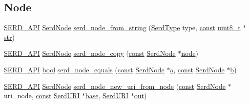\subsection*{Node}
\begin{DoxyCompactItemize}
\item 
\hyperlink{serd_8h_a17b2ce3a34831e5e95018430d798bd66}{S\+E\+R\+D\+\_\+\+A\+PI} \hyperlink{struct_serd_node}{Serd\+Node} \hyperlink{group__serd_gae76caf1b4e7a6465c9cb73ec11f568ea}{serd\+\_\+node\+\_\+from\+\_\+string} (\hyperlink{group__serd_ga7ccd8d4fb2c3a6ad690ed6d6fe1b45fa}{Serd\+Type} type, \hyperlink{getopt1_8c_a2c212835823e3c54a8ab6d95c652660e}{const} \hyperlink{lib-src_2ffmpeg_2win32_2stdint_8h_a9a941819355e6f658991890ff66b4b0e}{uint8\+\_\+t} $\ast$\hyperlink{sndfile__save_8m_a4b99ff73a8a869319570237b5c57ab03}{str})
\item 
\hyperlink{serd_8h_a17b2ce3a34831e5e95018430d798bd66}{S\+E\+R\+D\+\_\+\+A\+PI} \hyperlink{struct_serd_node}{Serd\+Node} \hyperlink{group__serd_ga5a25ffa37534176468ffc8e4e6ce8d7c}{serd\+\_\+node\+\_\+copy} (\hyperlink{getopt1_8c_a2c212835823e3c54a8ab6d95c652660e}{const} \hyperlink{struct_serd_node}{Serd\+Node} $\ast$\hyperlink{structnode}{node})
\item 
\hyperlink{serd_8h_a17b2ce3a34831e5e95018430d798bd66}{S\+E\+R\+D\+\_\+\+A\+PI} \hyperlink{mac_2config_2i386_2lib-src_2libsoxr_2soxr-config_8h_abb452686968e48b67397da5f97445f5b}{bool} \hyperlink{group__serd_ga19e58c93a79966be1e74d9d92f5ea167}{serd\+\_\+node\+\_\+equals} (\hyperlink{getopt1_8c_a2c212835823e3c54a8ab6d95c652660e}{const} \hyperlink{struct_serd_node}{Serd\+Node} $\ast$\hyperlink{rfft2d_test_m_l_8m_a4124bc0a9335c27f086f24ba207a4912}{a}, \hyperlink{getopt1_8c_a2c212835823e3c54a8ab6d95c652660e}{const} \hyperlink{struct_serd_node}{Serd\+Node} $\ast$\hyperlink{convtest_8m_a21ad0bd836b90d08f4cf640b4c298e7c}{b})
\item 
\hyperlink{serd_8h_a17b2ce3a34831e5e95018430d798bd66}{S\+E\+R\+D\+\_\+\+A\+PI} \hyperlink{struct_serd_node}{Serd\+Node} \hyperlink{group__serd_ga08700bbb56c7faaa1c4d979b922b839e}{serd\+\_\+node\+\_\+new\+\_\+uri\+\_\+from\+\_\+node} (\hyperlink{getopt1_8c_a2c212835823e3c54a8ab6d95c652660e}{const} \hyperlink{struct_serd_node}{Serd\+Node} $\ast$uri\+\_\+node, \hyperlink{getopt1_8c_a2c212835823e3c54a8ab6d95c652660e}{const} \hyperlink{struct_serd_u_r_i}{Serd\+U\+RI} $\ast$\hyperlink{lib_2expat_8h_a938e186c531ea86ae9adf3c0a649d8fc}{base}, \hyperlink{struct_serd_u_r_i}{Serd\+U\+RI} $\ast$\hyperlink{latency_8c_a71fd1c281affec034757279e4f91c50b}{out})
\item 

\end{DoxyCompactItemize}
